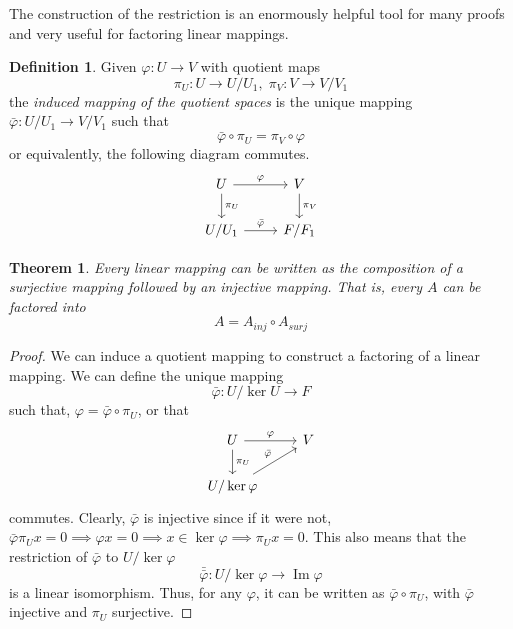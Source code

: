 \documentclass{article}
\DeclareMathOperator{\im}{Im}
\newtheorem{theorem}{Theorem}[section]
\theoremstyle{remark}
\theoremstyle{definition}
\newtheorem{definition}{Definition}[section]
\begin{document}
    The construction of the restriction is an enormously helpful tool for many proofs and very useful for factoring linear mappings. 

    \begin{definition}
    Given $\varphi: U \longrightarrow V$ with quotient maps 
    \[\pi_U: U \longrightarrow U / U_1, \; \pi_V: V \longrightarrow V / V_1 \]
    the \textit{induced mapping of the quotient spaces} is the unique mapping $\bar{\varphi}: U/U_1 \longrightarrow V / V_1$ such that 
    \[\bar{\varphi} \circ \pi_U = \pi_V \circ \varphi\]
    or equivalently, the following diagram commutes. 
    \[\begin{tikzcd}
        U \arrow{r}{\varphi} \arrow{d}{\pi_U} & V \arrow{d}{\pi_V}\\
        U / U_1 \arrow{r}{\bar{\varphi}} & F / F_1
    \end{tikzcd}\]
    \end{definition} 

    \begin{theorem}
    Every linear mapping can be written as the composition of a surjective mapping followed by an injective mapping. That is, every $A$ can be factored into 
    \[A = A_{inj} \circ A_{surj}\]
    \end{theorem}
    \begin{proof}
    We can induce a quotient mapping to construct a factoring of a linear mapping. We can define the unique mapping 
    \[\bar{\varphi}: U / \ker{U} \longrightarrow F\]
    such that, $\varphi = \bar{\varphi} \circ \pi_U$, or that 
    \[\begin{tikzcd}
         U \arrow{r}{\varphi} \arrow{d}{\pi_U} & V \\
         U / \ker{\varphi} \arrow{ru}{\bar{\varphi}}
    \end{tikzcd} \]
    commutes. Clearly, $\bar{\varphi}$ is injective since if it were not, $\bar{\varphi} \pi_U x = 0 \implies \varphi x = 0 \implies x \in \ker{\varphi} \implies \pi_U x = 0$. This also means that the restriction of $\bar{\varphi}$ to $U / \ker{\varphi}$
    \[\bar{\bar{\varphi}}: U / \ker{\varphi} \longrightarrow \im{\varphi}\]
    is a linear isomorphism. Thus, for any $\varphi$, it can be written as $\bar{\varphi} \circ \pi_U$, with $\bar{\varphi}$ injective and $\pi_U$ surjective. 
    \end{proof}
\end{document}
